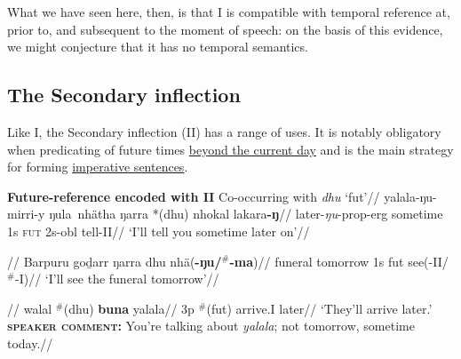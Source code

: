 What we have seen here, then, is that \gls{I} is compatible with temporal reference at, prior to, and subsequent to the moment of speech: on the basis of this evidence, we might conjecture that it has no temporal semantics. %

\subsection{The Secondary inflection}\label{desc-ii}

Like \gls{I}, the Secondary inflection (\gls{II}) has a range of uses. It is notably obligatory when predicating of future times \underline{beyond the current day} and is the main strategy for forming \underline{imperative sentences}.

\pex{} \textbf{Future-reference encoded with \gls{II}}
\a{}\begingl\glpreamble Co-occurring with \textit{dhu} `\gls{fut}'//
\gla yalala-ŋu-mirri-y ŋula~nhätha ŋarra *(dhu) nhokal lakara\textbf{-ŋ}//
\glb later-\textit{ŋu}-\gls{prop}-\gls{erg} sometime 1s \textsc{fut} 2s-\gls{obl} tell-\gls{II}//
\glft`I'll tell you sometime later on'//
\endgl

\a\begingl\glpreamble{}//
\gla Barpuru goḏarr ŋarra dhu nhä(\textbf{-ŋu/$^\#$-ma})//
\glb funeral tomorrow 1s \gls{fut} see(-\gls{II}/$^\#$-\gls{I})//
\glft `I'll see the funeral tomorrow'\trailingcitation{[AW~20180730]}//\endgl

\a\begingl\glpreamble{}//
\gla walal $^\#$(dhu) \textbf{buna} yalala//
\glb 3p $^\#$(\gls{fut}) arrive.\gls{I} later//
\glft`They'll arrive later.'\\
\textsc{\textbf{speaker comment:}} You're talking about \textit{yalala}; not tomorrow, sometime today.//\endgl


\xe

